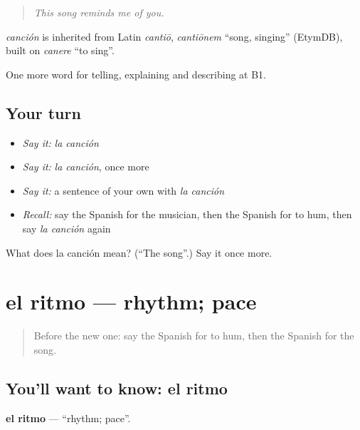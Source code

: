 \begin{quote}
\emph{This song reminds me of you.}
\end{quote}

\begin{cousinweb}
\emph{canción} is inherited from Latin \emph{cantiō}, \emph{cantiōnem} \textquotedblleft{}song, singing\textquotedblright{} (EtymDB), built on \emph{canere} \textquotedblleft{}to sing\textquotedblright{}.
\end{cousinweb}

\begin{grammarlens}[title={What you've built}]
One more word for telling, explaining and describing at B1.
\end{grammarlens}

\subsection*{Your turn}
\begin{itemize}
\raggedright
  \item \emph{Say it:} \emph{la canción}
  \item \emph{Say it:} \emph{la canción}, once more
  \item \emph{Say it:} a sentence of your own with \emph{la canción}
  \item \emph{Recall:} say the Spanish for the musician, then the Spanish for to hum, then say \emph{la canción} again
\end{itemize}

\begin{tcolorbox}[breakable,colback=teal!4,colframe=teal!35!black,title={Before you move on}]
What does la canción mean? (\textquotedblleft{}The song\textquotedblright{}.) Say it once more.
\end{tcolorbox}
\section[el ritmo]{el ritmo — rhythm; pace}

\label{lesson:ES-C753-ritmo}



\begin{quote}
Before the new one: say the Spanish for to hum, then the Spanish for the song.
\end{quote}

\subsection*{You'll want to know: el ritmo}
\textbf{el ritmo} — \textquotedblleft{}rhythm; pace\textquotedblright{}.

